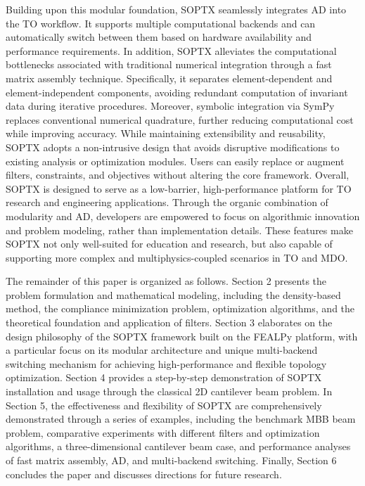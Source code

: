 \documentclass[mathpazo]{cicp}
\begin{document}
Building upon this modular foundation, SOPTX seamlessly integrates AD into the TO workflow. It supports multiple computational backends and can automatically switch between them based on hardware availability and performance requirements. In addition, SOPTX alleviates the computational bottlenecks associated with traditional numerical integration through a fast matrix assembly technique. Specifically, it separates element-dependent and element-independent components, avoiding redundant computation of invariant data during iterative procedures. Moreover, symbolic integration via SymPy \cite{unknown} replaces conventional numerical quadrature, further reducing computational cost while improving accuracy. While maintaining extensibility and reusability, SOPTX adopts a non-intrusive design that avoids disruptive modifications to existing analysis or optimization modules.  Users can easily replace or augment filters, constraints, and objectives without altering the core framework. Overall, SOPTX is designed to serve as a low-barrier, high-performance platform for TO research and engineering applications. Through the organic combination of modularity and AD, developers are empowered to focus on algorithmic innovation and problem modeling, rather than implementation details. These features make SOPTX not only well-suited for education and research, but also capable of supporting more complex and multiphysics-coupled scenarios in TO and MDO.

The remainder of this paper is organized as follows. Section 2 presents the problem formulation and mathematical modeling, including the density-based method, the compliance minimization problem, optimization algorithms, and the theoretical foundation and application of filters. Section 3 elaborates on the design philosophy of the SOPTX framework built on the FEALPy platform, with a particular focus on its modular architecture and unique multi-backend switching mechanism for achieving high-performance and flexible topology optimization. Section 4 provides a step-by-step demonstration of SOPTX installation and usage through the classical 2D cantilever beam problem. In Section 5, the effectiveness and flexibility of SOPTX are comprehensively demonstrated through a series of examples, including the benchmark MBB beam problem, comparative experiments with different filters and optimization algorithms, a three-dimensional cantilever beam case, and performance analyses of fast matrix assembly, AD, and multi-backend switching. Finally, Section 6 concludes the paper and discusses directions for future research.
\end{document}
